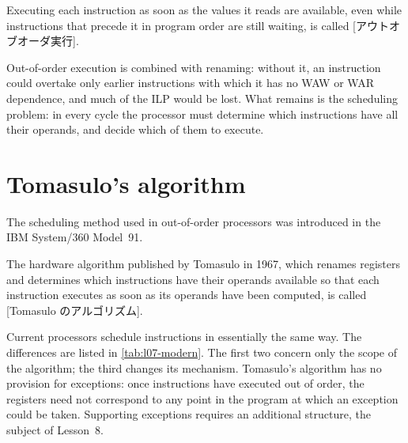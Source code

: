 \documentclass[../main.tex]{subfiles}
\begin{document}
\begin{definition}
  \label{def:l07-ooo}
  Executing each instruction as soon as the values it reads are available,
  even while instructions that precede it in program order are still waiting,
  is called [アウトオブオーダ実行].
\end{definition}

Out-of-order execution is combined with renaming: without it, an instruction
could overtake only earlier instructions with which it has no WAW or WAR
dependence, and much of the ILP would be lost.  What remains is the
scheduling problem: in every cycle the processor must determine which
instructions have all their operands, and decide which of them to execute.

\section{Tomasulo's algorithm}
\label{sec:l07-tomasulo}

The scheduling method used in out-of-order processors was introduced in the
IBM System/360 Model~91.

\begin{definition}
  \label{def:l07-tomasulo}
  The hardware algorithm published by Tomasulo in 1967, which renames
  registers and determines which instructions have their operands available
  so that each instruction executes as soon as its operands have been
  computed, is called [Tomasulo のアルゴリズム].
\end{definition}

Current processors schedule instructions in essentially the same
way.  The
differences are listed in \cref{tab:l07-modern}.  The first two concern only
the scope of the algorithm; the third changes its mechanism.
Tomasulo's algorithm has no provision for exceptions: once instructions have
executed out of order, the registers need not correspond to any point in
the program at which an exception could be taken.  Supporting exceptions
requires an additional structure, the subject of
Lesson~8.
\end{document}
